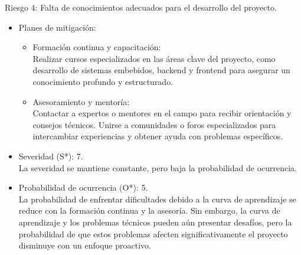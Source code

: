 Riesgo 4: Falta de conocimientos adecuados para el desarrollo del proyecto.
\begin{itemize}
	\item Planes de mitigación:\\
	      \begin{itemize}
		      \item Formación continua y capacitación:\\ Realizar cursos especializados en las
		            áreas clave del proyecto, como desarrollo de sistemas embebidos, backend y
		            frontend para asegurar un conocimiento profundo y estructurado.
		      \item Asesoramiento y mentoría:\\ Contactar a expertos o mentores en el campo para
		            recibir orientación y consejos técnicos. Unirse a comunidades o foros
		            especializados para intercambiar experiencias y obtener ayuda con problemas
		            específicos.
	      \end{itemize}
	\item Severidad (S*): 7.\\ La severidad se mantiene constante, pero baja la probabilidad de ocurrencia.
	\item Probabilidad de ocurrencia (O*): 5.\\ La probabilidad de enfrentar dificultades
	      debido a la curva de aprendizaje se reduce con la formación continua y la
	      asesoría. Sin embargo, la curva de aprendizaje y los problemas técnicos pueden
	      aún presentar desafíos, pero la probabilidad de que estos problemas afecten
	      significativamente el proyecto disminuye con un enfoque proactivo.
\end{itemize}
